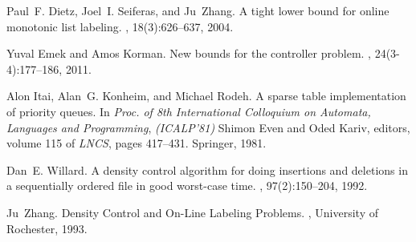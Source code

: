 \documentclass[11pt]{article}
\begin{document}
\begin{thebibliography}{32}
Paul~F. Dietz, Joel~I. Seiferas, and Ju~Zhang.
\newblock A tight lower bound for online monotonic list labeling.
, 18(3):626--637, 2004.


Yuval Emek and Amos Korman.
\newblock New bounds for the controller problem.
, 24(3-4):177--186, 2011.

Alon Itai, Alan~G. Konheim, and Michael Rodeh.
\newblock A sparse table implementation of priority queues.
\newblock In \emph{Proc. of 8th International Colloquium on Automata, Languages and Programming}, {\em (ICALP'81)} Shimon Even and Oded Kariv, editors, volume 115 of {\em LNCS}, pages 417--431. Springer, 1981.

Dan~E. Willard.
\newblock A density control algorithm for doing insertions and deletions in a sequentially ordered file in good worst-case time.
, 97(2):150--204, 1992.

Ju~Zhang.
\newblock Density Control and On-Line Labeling Problems.
, University of Rochester, 1993.
\end{thebibliography}
\end{document}
